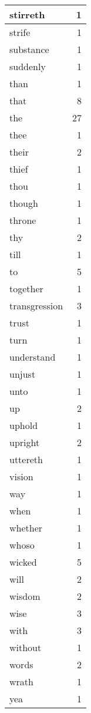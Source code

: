 \begin{center}
\begin{longtable}{l|r}
stirreth & 1\\ \hline 
strife & 1\\ \hline 
substance & 1\\ \hline 
suddenly & 1\\ \hline 
than & 1\\ \hline 
that & 8\\ \hline 
the & 27\\ \hline 
thee & 1\\ \hline 
their & 2\\ \hline 
thief & 1\\ \hline 
thou & 1\\ \hline 
though & 1\\ \hline 
throne & 1\\ \hline 
thy & 2\\ \hline 
till & 1\\ \hline 
to & 5\\ \hline 
together & 1\\ \hline 
transgression & 3\\ \hline 
trust & 1\\ \hline 
turn & 1\\ \hline 
understand & 1\\ \hline 
unjust & 1\\ \hline 
unto & 1\\ \hline 
up & 2\\ \hline 
uphold & 1\\ \hline 
upright & 2\\ \hline 
uttereth & 1\\ \hline 
vision & 1\\ \hline 
way & 1\\ \hline 
when & 1\\ \hline 
whether & 1\\ \hline 
whoso & 1\\ \hline 
wicked & 5\\ \hline 
will & 2\\ \hline 
wisdom & 2\\ \hline 
wise & 3\\ \hline 
with & 3\\ \hline 
without & 1\\ \hline 
words & 2\\ \hline 
wrath & 1\\ \hline 
yea & 1\\ \hline 
\end{longtable}  
\end{center}  


